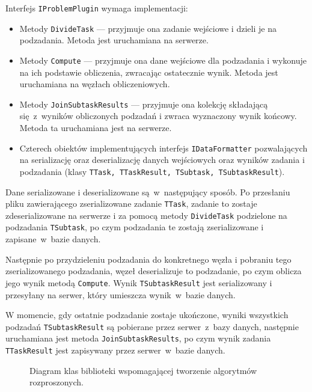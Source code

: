 \documentclass[a4paper,11pt,twoside]{report}
\theoremstyle{definition}
\begin{document}
Interfejs \texttt{IProblemPlugin} wymaga implementacji:
\begin{itemize}
    \item Metody \texttt{DivideTask} --- przyjmuje ona zadanie wejściowe i dzieli je na podzadania. Metoda jest uruchamiana na serwerze.
    \item Metody \texttt{Compute} --- przyjmuje ona dane wejściowe dla podzadania i wykonuje na ich podstawie obliczenia, zwracając ostatecznie wynik. Metoda jest uruchamiana na węzłach obliczeniowych.
    \item Metody \texttt{JoinSubtaskResults} --- przyjmuje ona kolekcję składającą się~z~wyników obliczonych podzadań i zwraca wyznaczony wynik końcowy. Metoda ta uruchamiana jest na serwerze.
    \item Czterech obiektów implementujących interfejs \texttt{IDataFormatter} pozwalających na serializację oraz deserializację danych wejściowych oraz wyników zadania i podzadania (klasy \texttt{TTask, TTaskResult, TSubtask, TSubtaskResult}).
\end{itemize}

Dane serializowane i deserializowane są~w~następujący sposób. Po przesłaniu pliku zawierającego zserializowane zadanie \texttt{TTask}, zadanie to zostaje zdeserializowane na serwerze i za pomocą metody \texttt{DivideTask} podzielone na podzadania \texttt{TSubtask}, po czym podzadania te zostają zserializowane i zapisane~w~bazie danych.

Następnie po przydzieleniu podzadania do konkretnego węzła i pobraniu tego zserializowanego podzadania, węzeł deserializuje to podzadanie, po czym oblicza jego wynik metodą \texttt{Compute}. Wynik \texttt{TSubtaskResult} jest serializowany i przesyłany na serwer, który umieszcza wynik~w~bazie danych.

W momencie, gdy ostatnie podzadanie zostaje ukończone, wyniki wszystkich podzadań \texttt{TSubtaskResult} są pobierane przez serwer~z~bazy danych, następnie uruchamiana jest metoda \texttt{JoinSubtaskResults}, po czym wynik zadania \texttt{TTaskResult} jest zapisywany przez serwer~w~bazie danych.

\begin{figure} 
    \caption{Diagram klas biblioteki wspomagającej tworzenie algorytmów rozproszonych.}
    \label{library-class}
\end{figure}
\end{document}

